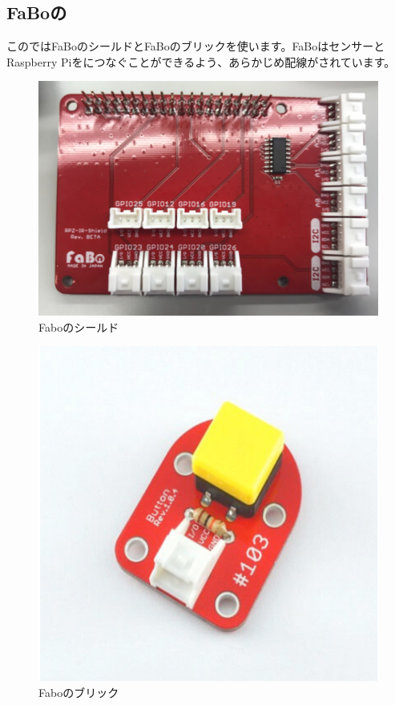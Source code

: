 \subsection{FaBoの}
このではFaBoのシールドとFaBoのブリックを使います。FaBoはセンサーとRaspberry Piをにつなぐことができるよう、あらかじめ配線がされています。
\begin{center}
  \begin{minipage}[b]{0.45\linewidth}
    \begin{figure}[H]
      \centering
      \includegraphics[keepaspectratio, scale=0.6]{images/chap05/text05-img004.png}
      \caption{Faboのシールド}
      \label{fig4}
    \end{figure}
  \end{minipage}
  \begin{minipage}[b]{0.45\linewidth}
    \begin{figure}[H]
      \centering
      \includegraphics[keepaspectratio, scale=0.6]{images/chap05/text05-img005.png}
      \caption{Faboのブリック}
      \label{fig5}
    \end{figure}
  \end{minipage}
\end{center}
